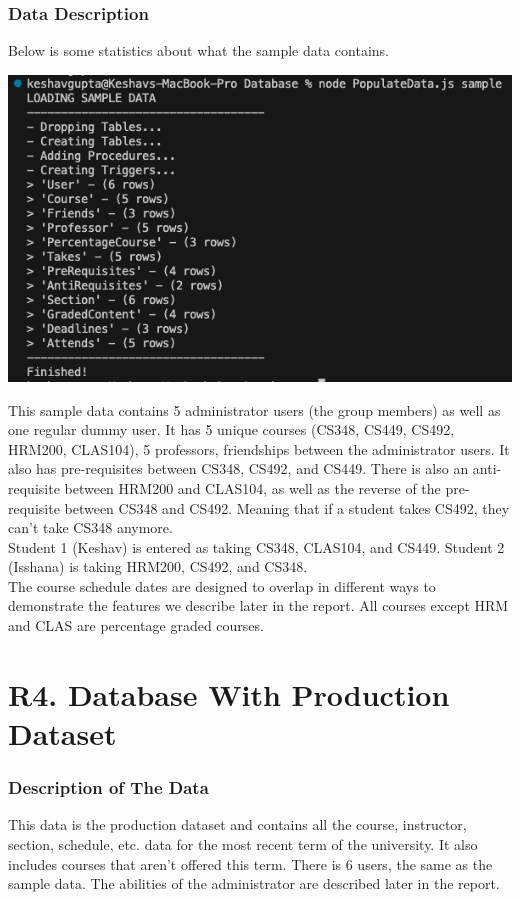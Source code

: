 \documentclass[12pt, a4paper]{article}
\begin{document}
\subsubsection*{Data Description}
Below is some statistics about what the sample data contains.
\begin{center}
    \includegraphics[width=\textwidth]{sampledata}
\end{center}

This sample data contains 5 administrator users (the group members) as well as one regular dummy user. It has 5 unique courses (CS348, CS449, CS492, HRM200, CLAS104), 5 professors, friendships between the administrator users. It also has pre-requisites between CS348, CS492, and CS449. There is also an anti-requisite between HRM200 and CLAS104, as well as the reverse of the pre-requisite between CS348 and CS492. Meaning that if a student takes CS492, they can't take CS348 anymore.\\
Student 1 (Keshav) is entered as taking CS348, CLAS104, and CS449. Student 2 (Isshana) is taking HRM200, CS492, and CS348.\\

The course schedule dates are designed to overlap in different ways to demonstrate the features we describe later in the report. All courses except HRM and CLAS are percentage graded courses.
\section*{R4. Database With Production Dataset}
\label{sec:R4}
\subsubsection*{Description of The Data}
This data is the production dataset and contains all the course, instructor, section, schedule, etc. data for the most recent term of the university. It also includes courses that aren't offered this term. There is 6 users, the same as the sample data. The abilities of the administrator are described later in the report.\\
\end{document}
